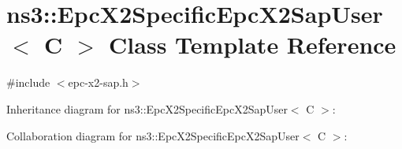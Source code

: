 \hypertarget{classns3_1_1EpcX2SpecificEpcX2SapUser}{}\section{ns3\+:\+:Epc\+X2\+Specific\+Epc\+X2\+Sap\+User$<$ C $>$ Class Template Reference}
\label{classns3_1_1EpcX2SpecificEpcX2SapUser}


{\ttfamily \#include $<$epc-\/x2-\/sap.\+h$>$}



Inheritance diagram for ns3\+:\+:Epc\+X2\+Specific\+Epc\+X2\+Sap\+User$<$ C $>$\+:


Collaboration diagram for ns3\+:\+:Epc\+X2\+Specific\+Epc\+X2\+Sap\+User$<$ C $>$\+:
